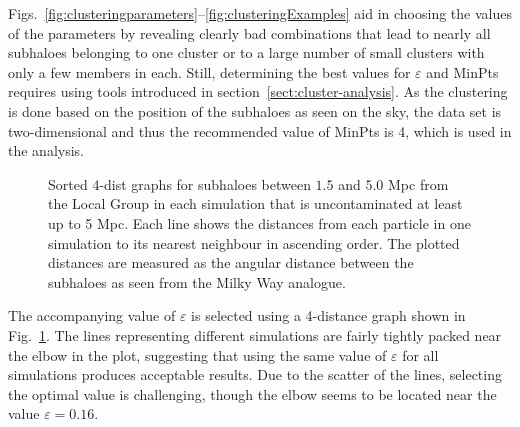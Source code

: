 \documentclass[english, oneside]{HYgradu}
\begin{document}
Figs.~\ref{fig:clusteringparameters}--\ref{fig:clusteringExamples} aid in choosing the values of the parameters by revealing clearly bad combinations that lead to nearly all subhaloes belonging to one cluster or to a large number of small clusters with only a few members in each. Still, determining the best values for $\varepsilon$ and MinPts requires using tools introduced in section~\ref{sect:cluster-analysis}. As the clustering is done based on the position of the subhaloes as seen on the sky, the data set is two-dimensional and thus the recommended value of MinPts is 4, which is used in the analysis.

\begin{figure}
    \centering
    
    \caption{Sorted 4-dist graphs for subhaloes between $1.5$ and $5.0$ Mpc from the Local Group in each simulation that is uncontaminated at least up to 5 Mpc. Each line shows the distances from each particle in one simulation to its  nearest neighbour in ascending order. The plotted distances are measured as the angular distance between the subhaloes as seen from the Milky Way analogue. %
    }\label{fig:4-distances}
\end{figure}

The accompanying value of $\varepsilon$ is selected using a 4-distance graph shown in Fig.~\ref{fig:4-distances}. The lines representing different simulations are fairly tightly packed near the elbow in the plot, suggesting that using the same value of $\varepsilon$ for all simulations produces acceptable results. Due to the scatter of the lines, selecting the optimal value is challenging, though the elbow seems to be located near the value $\varepsilon = 0.16$.
\end{document}
